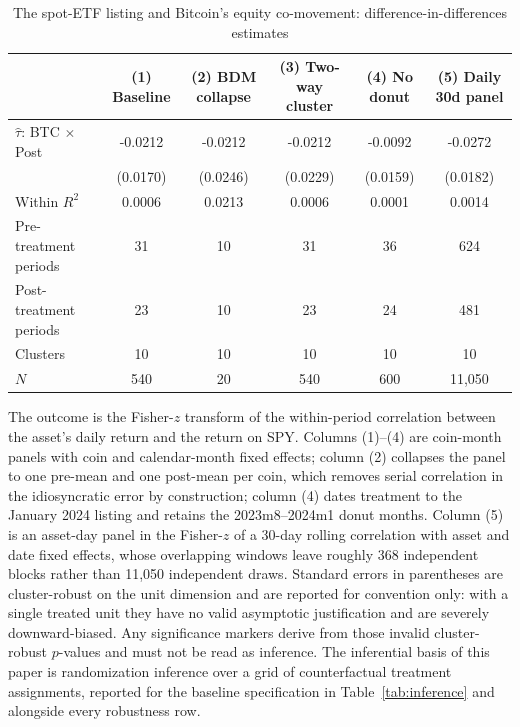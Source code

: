 \begin{table}[t]
\centering
\begin{threeparttable}
\caption{The spot-ETF listing and Bitcoin's equity co-movement: difference-in-differences estimates}
\label{tab:main}
\begin{tabular}{lccccc}
\toprule
 & (1) Baseline & (2) BDM collapse & (3) Two-way cluster & (4) No donut & (5) Daily 30d panel \\
\midrule
$\hat\tau$: BTC $\times$ Post & -0.0212 & -0.0212 & -0.0212 & -0.0092 & -0.0272 \\
 & (0.0170) & (0.0246) & (0.0229) & (0.0159) & (0.0182) \\
Within $R^2$ & 0.0006 & 0.0213 & 0.0006 & 0.0001 & 0.0014 \\
Pre-treatment periods & 31 & 10 & 31 & 36 & 624 \\
Post-treatment periods & 23 & 10 & 23 & 24 & 481 \\
Clusters & 10 & 10 & 10 & 10 & 10 \\
$N$ & 540 & 20 & 540 & 600 & 11,050 \\
\bottomrule
\end{tabular}
\begin{tablenotes}[flushleft]
\footnotesize
\item The outcome is the Fisher-$z$ transform of the within-period correlation between the asset's daily return and the return on SPY. Columns (1)--(4) are coin-month panels with coin and calendar-month fixed effects; column (2) collapses the panel to one pre-mean and one post-mean per coin, which removes serial correlation in the idiosyncratic error by construction; column (4) dates treatment to the January 2024 listing and retains the 2023m8--2024m1 donut months. Column (5) is an asset-day panel in the Fisher-$z$ of a 30-day rolling correlation with asset and date fixed effects, whose overlapping windows leave roughly 368 independent blocks rather than 11,050 independent draws. Standard errors in parentheses are cluster-robust on the unit dimension and are reported for convention only: with a single treated unit they have no valid asymptotic justification and are severely downward-biased. Any significance markers derive from those invalid cluster-robust $p$-values and must not be read as inference. The inferential basis of this paper is randomization inference over a grid of counterfactual treatment assignments, reported for the baseline specification in Table~\ref{tab:inference} and alongside every robustness row.
\end{tablenotes}
\end{threeparttable}
\end{table}
